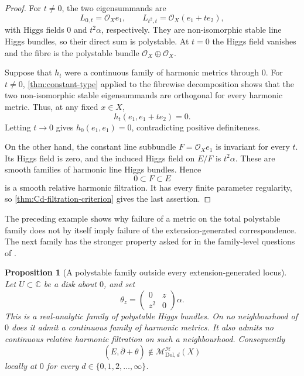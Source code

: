 \documentclass[11pt,reqno]{amsart}
\newtheorem{proposition}[theorem]{Proposition}
\theoremstyle{definition}
\theoremstyle{remark}
\newcommand{\C}{\mathbb C}
\newcommand{\cH}{\mathcal H}
\newcommand{\Dol}{\mathrm{Dol}}
\newcommand{\ddbar}{\overline\partial}
\begin{document}
\begin{proof}
For $t\ne0$, the two eigensummands are
\[
  L_{0,t}=\mathcal O_X e_1,
  \qquad
  L_{t^2,t}=\mathcal O_X(e_1+t e_2),
\]
with Higgs fields $0$ and $t^2\alpha$, respectively.  They are non-isomorphic stable line Higgs bundles, so their direct sum is polystable.  At $t=0$ the Higgs field vanishes and the fibre is the polystable bundle $\mathcal O_X\oplus\mathcal O_X$.

Suppose that $h_t$ were a continuous family of harmonic metrics through $0$.  For $t\ne0$, \cref{thm:constant-type} applied to the fibrewise decomposition shows that the two non-isomorphic stable eigensummands are orthogonal for every harmonic metric.  Thus, at any fixed $x\in X$,
\[
  h_t(e_1,e_1+t e_2)=0.
\]
Letting $t\to0$ gives $h_0(e_1,e_1)=0$, contradicting positive definiteness.

On the other hand, the constant line subbundle $F=\mathcal O_Xe_1$ is invariant for every $t$.  Its Higgs field is zero, and the induced Higgs field on $E/F$ is $t^2\alpha$.  These are smooth families of harmonic line Higgs bundles.  Hence
\[
  0\subset F\subset E
\]
is a smooth relative harmonic filtration.  It has every finite parameter regularity, so \cref{thm:Cd-filtration-criterion} gives the last assertion.
\end{proof}

The preceding example shows why failure of a metric on the total polystable family does not by itself imply failure of the extension-generated correspondence.  The next family has the stronger property asked for in the family-level questions of \cite{AzamRayan2026}.

\begin{proposition}[A polystable family outside every extension-generated locus]\label{prop:square-root-polystable-failure}
Let $U\subset\C$ be a disk about $0$, and set
\begin{equation}\label{eq:square-root-polystable-family}
  \theta_z
  =
  \begin{pmatrix}
    0&z\\
    z^2&0
  \end{pmatrix}\alpha.
\end{equation}
This is a real-analytic family of polystable Higgs bundles.  On no neighbourhood of $0$ does it admit a continuous family of harmonic metrics.  It also admits no continuous relative harmonic filtration on such a neighbourhood.  Consequently
\[
  (E,\ddbar+\theta)\notin\mathscr M_{\Dol,d}^{\cH}(X)
\]
locally at $0$ for every $d\in\{0,1,2,\ldots,\infty\}$.
\end{proposition}
\end{document}
